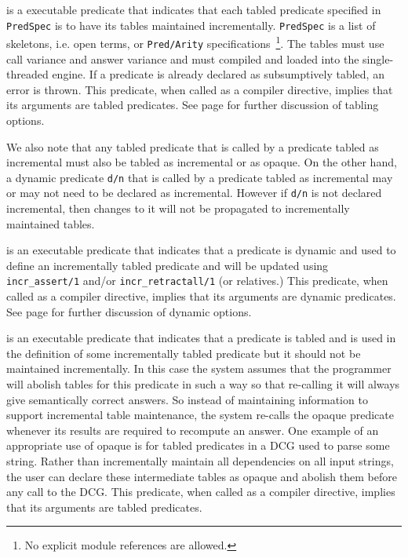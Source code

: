 \begin{description}

%
is a executable predicate that indicates that each tabled predicate
specified in {\tt PredSpec} is to have its tables maintained
incrementally.  {\tt PredSpec} is a list of skeletons, i.e. open
terms, or {\tt Pred/Arity} specifications~\footnote{No explicit module
  references are allowed.}.  The tables must use call variance and
answer variance and must compiled and loaded into the single-threaded
engine.  If a predicate is already declared as subsumptively tabled,
an error is thrown.  This predicate, when called as a compiler
directive, implies that its arguments are tabled predicates.  See page
\pageref{table-declaration} for further discussion of tabling options.

We also note that any tabled predicate that is called by a predicate
tabled as incremental must also be tabled as incremental or as opaque.
On the other hand, a dynamic predicate {\tt d/n} that is called by a
predicate tabled as incremental may or may not need to be declared as
incremental.  However if {\tt d/n} is not declared incremental, then
changes to it will not be propagated to incrementally maintained
tables.

%
is an executable predicate that indicates that a predicate is dynamic
and used to define an incrementally tabled predicate and will be
updated using {\tt incr\_assert/1} and/or {\tt incr\_retractall/1} (or
relatives.)  This predicate, when called as a compiler directive,
implies that its arguments are dynamic predicates.  See page
\pageref{dynamic-declaration} for further discussion of dynamic
options.

%
is an executable predicate that indicates that a predicate is tabled
and is used in the definition of some incrementally tabled predicate
but it should not be maintained incrementally.  In this case the
system assumes that the programmer will abolish tables for this
predicate in such a way so that re-calling it will always give
semantically correct answers.  So instead of maintaining information
to support incremental table maintenance, the system re-calls the
opaque predicate whenever its results are required to recompute an
answer.  One example of an appropriate use of opaque is for tabled
predicates in a DCG used to parse some string.  Rather than
incrementally maintain all dependencies on all input strings, the user
can declare these intermediate tables as opaque and abolish them
before any call to the DCG.  This predicate, when called as a compiler
directive, implies that its arguments are tabled predicates.

\end{description}

